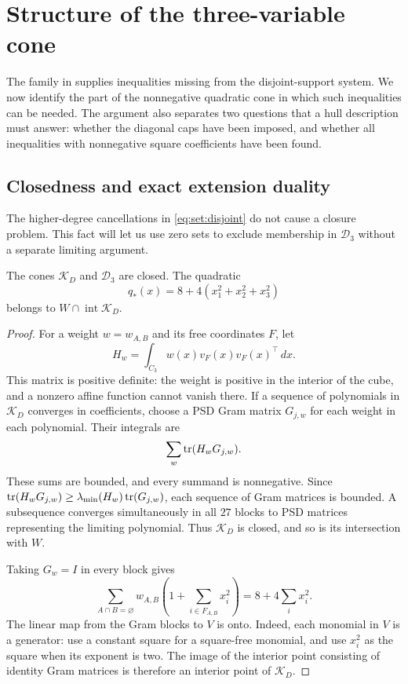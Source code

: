 \section{Structure of the three-variable cone}\label{sec:three}

The family in  supplies inequalities missing from the
disjoint-support system. We now identify the part of the nonnegative
quadratic cone in which such inequalities can be needed. The argument also
separates two questions that a hull description must answer: whether the
diagonal caps have been imposed, and whether all inequalities with
nonnegative square coefficients have been found.

\subsection{Closedness and exact extension duality}

The higher-degree cancellations in \eqref{eq:set:disjoint} do not cause a
closure problem. This fact will let us use zero sets to exclude membership
in $\mathcal D_3$ without a separate limiting argument.

\begin{lemma}\label{three:closed}
The cones $\mathcal K_D$ and $\mathcal D_3$ are closed. The quadratic
\[
 q_*(x)=8+4(x_1^2+x_2^2+x_3^2)
\]
belongs to $W\cap\operatorname{int}\mathcal K_D$.
\end{lemma}
\begin{proof}
For a weight $w=w_{A,B}$ and its free coordinates $F$, let
\[
 H_w=\int_{C_3}w(x)v_F(x)v_F(x)^\top\,dx.
\]
This matrix is positive definite: the weight is positive in the interior
of the cube, and a nonzero affine function cannot vanish there. If a
sequence of polynomials in $\mathcal K_D$ converges in coefficients, choose a PSD
Gram matrix $G_{j,w}$ for each weight in each polynomial. Their integrals
are
\[
 \sum_w\operatorname{tr}(H_wG_{j,w}).
\]
These sums are bounded, and every summand is nonnegative. Since
$\operatorname{tr}(H_wG_{j,w})\ge\lambda_{\min}(H_w)\operatorname{tr}(G_{j,w})$, each sequence of Gram
matrices is bounded. A subsequence converges simultaneously in all $27$
blocks to PSD matrices representing the limiting polynomial. Thus $\mathcal K_D$
is closed, and so is its intersection with $W$.

Taking $G_w=I$ in every block gives
\[
 \sum_{A\cap B=\varnothing}w_{A,B}
       \left(1+\sum_{i\in F_{A,B}}x_i^2\right)
       =8+4\sum_i x_i^2.
\]
The linear map from the Gram blocks to $V$ is onto. Indeed, each monomial
in $V$ is a generator: use a constant square for a square-free monomial,
and use $x_i^2$ as the square when its exponent is two. The image of the
interior point consisting of identity Gram matrices is therefore an
interior point of $\mathcal K_D$.
\end{proof}

